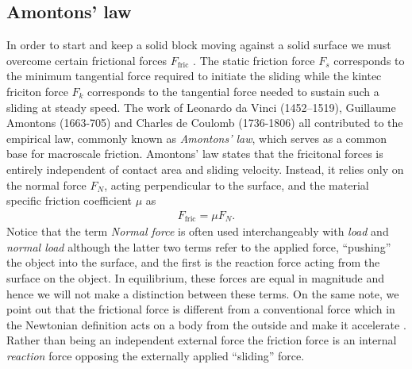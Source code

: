 \subsection{Amontons’ law}
 
 In order to start and keep a solid block moving against a solid surface we must
 overcome certain frictional forces $F_{\text{fric}}$ \cite{gnecco_meyer_2015}.
 The static friction force $F_s$ corresponds to the minimum tangential force
 required to initiate the sliding while the kintec friciton force $F_k$
 corresponds to the tangential force needed to sustain such a sliding at steady
 speed. The work of Leonardo da Vinci (1452–1519), Guillaume Amontons (1663-705)
 and Charles de Coulomb (1736-1806) all contributed to the empirical law,
 commonly known as \textit{Amontons’ law}, which serves as a common base for macroscale
 friction. Amontons’ law states that the fricitonal forces is entirely
 independent of contact area and sliding velocity. Instead, it relies only on
 the normal force $F_N$, acting perpendicular to the surface, and the material specific friction coefficient $\mu$ as
\begin{align}
  F_{\text{fric}} = \mu F_N.
  \label{eq:amonton}
\end{align}
Notice that the term \textit{Normal force} is often used interchangeably
with \textit{load} and \textit{normal load} although the latter two terms refer to the applied force, ``pushing'' the object into the surface, and the first is the reaction force acting from the surface on the object. In equilibrium, these forces are equal in magnitude and hence we will not make a distinction between these terms. On the same note, we point out that the frictional force is different from a conventional force which in the Newtonian definition acts on a body from the outside and make it accelerate \cite{gao_frictional_2004}. Rather than being an independent external force the friction force is an internal \textit{reaction} force opposing the externally applied ``sliding'' force. 

